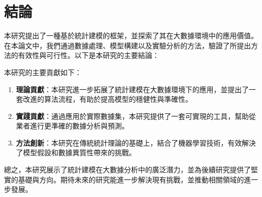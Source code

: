 \chapter{結論}
\label{c:conclusions}

本研究提出了一種基於統計建模的框架，並探索了其在大數據環境中的應用價值。在本論文中，我們通過數據處理、模型構建以及實驗分析的方法，驗證了所提出方法的有效性與可行性。以下是本研究的主要結論：

本研究的主要貢獻如下：
\begin{enumerate}
  \item \textbf{理論貢獻}：本研究進一步拓展了統計建模在大數據環境下的應用，並提出了一套改進的算法流程，有助於提高模型的穩健性與準確性。
  \item \textbf{實踐貢獻}：通過應用於實際數據集，本研究提供了一套可實現的工具，幫助從業者進行更準確的數據分析與預測。
  \item \textbf{方法創新}：本研究在傳統統計理論的基礎上，結合了機器學習技術，有效解決了模型假設和數據異質性帶來的挑戰。
\end{enumerate}

總之，本研究展示了統計建模在大數據分析中的廣泛潛力，並為後續研究提供了堅實的基礎與方向。期待未來的研究能進一步解決現有挑戰，並推動相關領域的進一步發展。
